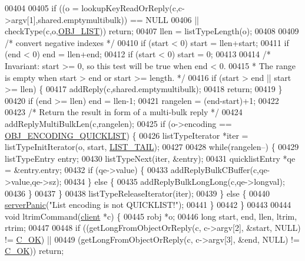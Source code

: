 \begin{DoxyCode}
00404 
00405     \textcolor{keywordflow}{if} ((o = lookupKeyReadOrReply(c,c->argv[1],shared.emptymultibulk)) == NULL
00406          || checkType(c,o,\hyperlink{server_8h_a4a5f22a280949c97a0cb0d4213275126}{OBJ\_LIST})) \textcolor{keywordflow}{return};
00407     llen = listTypeLength(o);
00408 
00409     \textcolor{comment}{/* convert negative indexes */}
00410     \textcolor{keywordflow}{if} (start < 0) start = llen+start;
00411     \textcolor{keywordflow}{if} (end < 0) end = llen+end;
00412     \textcolor{keywordflow}{if} (start < 0) start = 0;
00413 
00414     \textcolor{comment}{/* Invariant: start >= 0, so this test will be true when end < 0.}
00415 \textcolor{comment}{     * The range is empty when start > end or start >= length. */}
00416     \textcolor{keywordflow}{if} (start > end || start >= llen) \{
00417         addReply(c,shared.emptymultibulk);
00418         \textcolor{keywordflow}{return};
00419     \}
00420     \textcolor{keywordflow}{if} (end >= llen) end = llen-1;
00421     rangelen = (end-start)+1;
00422 
00423     \textcolor{comment}{/* Return the result in form of a multi-bulk reply */}
00424     addReplyMultiBulkLen(c,rangelen);
00425     \textcolor{keywordflow}{if} (o->encoding == \hyperlink{server_8h_aec792aeed6d4bf83966672e6a23043b8}{OBJ\_ENCODING\_QUICKLIST}) \{
00426         listTypeIterator *iter = listTypeInitIterator(o, start, \hyperlink{server_8h_a745de98bef5b645df56479181803235b}{LIST\_TAIL});
00427 
00428         \textcolor{keywordflow}{while}(rangelen--) \{
00429             listTypeEntry entry;
00430             listTypeNext(iter, &entry);
00431             quicklistEntry *qe = &entry.entry;
00432             \textcolor{keywordflow}{if} (qe->value) \{
00433                 addReplyBulkCBuffer(c,qe->value,qe->sz);
00434             \} \textcolor{keywordflow}{else} \{
00435                 addReplyBulkLongLong(c,qe->longval);
00436             \}
00437         \}
00438         listTypeReleaseIterator(iter);
00439     \} \textcolor{keywordflow}{else} \{
00440         \hyperlink{server_8h_a11cc378e7778a830b41240578de3b204}{serverPanic}(\textcolor{stringliteral}{"List encoding is not QUICKLIST!"});
00441     \}
00442 \}
00443 
00444 \textcolor{keywordtype}{void} ltrimCommand(\hyperlink{structclient}{client} *c) \{
00445     robj *o;
00446     \textcolor{keywordtype}{long} start, end, llen, ltrim, rtrim;
00447 
00448     \textcolor{keywordflow}{if} ((getLongFromObjectOrReply(c, c->argv[2], &start, NULL) != \hyperlink{server_8h_a303769ef1065076e68731584e758d3e1}{C\_OK}) ||
00449         (getLongFromObjectOrReply(c, c->argv[3], &end, NULL) != \hyperlink{server_8h_a303769ef1065076e68731584e758d3e1}{C\_OK})) \textcolor{keywordflow}{return};

\end{DoxyCode}
